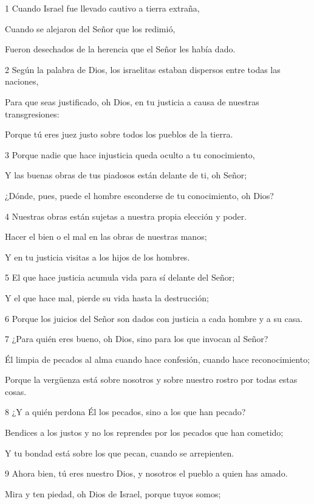\par 1 Cuando Israel fue llevado cautivo a tierra extraña,
\par     Cuando se alejaron del Señor que los redimió,
\par     Fueron desechados de la herencia que el Señor les había dado.
\par 2 Según la palabra de Dios, los israelitas estaban dispersos entre todas las naciones,
\par     Para que seas justificado, oh Dios, en tu justicia a causa de nuestras transgresiones:
\par     Porque tú eres juez justo sobre todos los pueblos de la tierra.
\par 3 Porque nadie que hace injusticia queda oculto a tu conocimiento,
\par     Y las buenas obras de tus piadosos están delante de ti, oh Señor;
\par     ¿Dónde, pues, puede el hombre esconderse de tu conocimiento, oh Dios?
\par 4 Nuestras obras están sujetas a nuestra propia elección y poder.
\par     Hacer el bien o el mal en las obras de nuestras manos;
\par     Y en tu justicia visitas a los hijos de los hombres.
\par 5 El que hace justicia acumula vida para sí delante del Señor;
\par     Y el que hace mal, pierde su vida hasta la destrucción;
\par 6 Porque los juicios del Señor son dados con justicia a cada hombre y a su casa.
\par 7 ¿Para quién eres bueno, oh Dios, sino para los que invocan al Señor?
\par     Él limpia de pecados al alma cuando hace confesión, cuando hace reconocimiento;
\par     Porque la vergüenza está sobre nosotros y sobre nuestro rostro por todas estas cosas.
\par 8 ¿Y a quién perdona Él los pecados, sino a los que han pecado?
\par     Bendices a los justos y no los reprendes por los pecados que han cometido;
\par     Y tu bondad está sobre los que pecan, cuando se arrepienten.
\par 9 Ahora bien, tú eres nuestro Dios, y nosotros el pueblo a quien has amado.
\par     Mira y ten piedad, oh Dios de Israel, porque tuyos somos;
